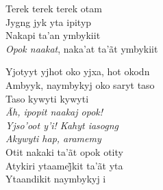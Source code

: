 \bigskip

\begin{linenumbers}\begingroup\raggedright

\noindent   Terek terek terek otam\\
  Jygng jyk yta ipityp\\
  Nakapi ta'an ymbykiit\\
  \emph{Opok naakat}, naka'at ta'ãt ymbykiit

\end{linenumbers}\endgroup

\bigskip

\begin{linenumbers}\begingroup\raggedright

\noindent   Yjotyyt yjhot oko yjxa, hot okodn\\
  Ambyyk, naymbykyj oko saryt taso\\
  Taso kywyti kywyti\\
  \emph{Ãh, ipopit naakaj opok!}\\
  \emph{Yjso'oot y'i! Kahyt iasogng}\\
  \emph{Akywyti hap, aramemy}\\
  Otit nakaki ta'ãt opok otity\\
  Atykiri ytaamej̃kit ta’ãt yta\\
  Ytaandikit naymbykyj i

\end{linenumbers}\endgroup

\bigskip

